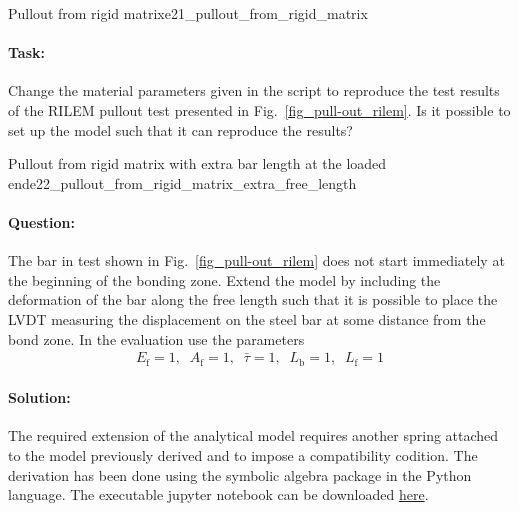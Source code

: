 \documentclass[main.tex]{subfiles}
\begin{document}
\begin{bmcsex}{Pullout from rigid matrix}{e21_pullout_from_rigid_matrix}
\paragraph{Task:} Change the material parameters given in the script to reproduce the test results of the RILEM pullout test presented in Fig.~\ref{fig_pull-out_rilem}. Is it possible to set up the model such that it can reproduce the results? 

\end{bmcsex}
\newpage
\begin{bmcsex}{Pullout from rigid matrix with extra bar length at the loaded end}{e22_pullout_from_rigid_matrix_extra_free_length}
\paragraph{Question:} The bar in test shown in Fig.~\ref{fig_pull-out_rilem}
does not start immediately at the beginning of the bonding zone. 
Extend the model by including the deformation of the bar along the free length 
such that it is possible to place the LVDT measuring 
the displacement on the steel bar at some distance from the bond zone.
In the evaluation use the parameters
\begin{align}
    E_\mathrm{f} = 1, \;\; 
    A_\mathrm{f} = 1, \;\;
    \bar{\tau} = 1, \;\;
    L_\mathrm{b} = 1, \;\;
    L_\mathrm{f} = 1
\end{align}

\paragraph{Solution:} 
The required extension of the analytical model requires another spring 
attached to the model previously derived and to impose a compatibility 
codition. The derivation has been done using 
the symbolic algebra package in the Python language.
The executable jupyter notebook can be downloaded  \href{https://moodle.rwth-aachen.de/pluginfile.php/261132/mod_folder/content/0/example_2.2_pullout_from_rigid_matrix_with_free_length.ipynb?forcedownload=1}{here}.


\end{bmcsex}
\end{document}
